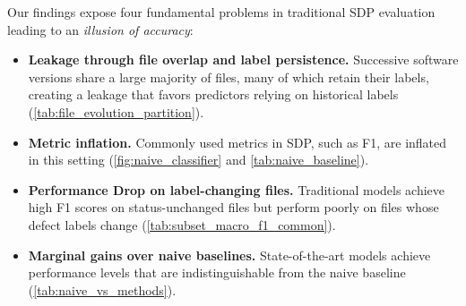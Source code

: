 \documentclass[authoryear,final,5p,times,twocolumn]{elsarticle}
\theoremstyle{plain}
\begin{document}
\begin{table}[!htbp]
\centering
\caption{F1 scores on subsets of common files ($\mathcal{C}$) grouped by file
evolution (\autoref{sec:problem_formulation}): \textit{Same} files have
identical source code, \textit{Unchanged} files have changed source code with
unchanged labels, and \textit{Changed} files have both source-code and label
changes.}
\label{tab:subset_macro_f1_common}
\renewcommand{\arraystretch}{1.2} 
\end{table}

Our findings expose four fundamental problems in traditional SDP evaluation leading to an \emph{illusion of accuracy}:

\begin{itemize}
\item \textbf{Leakage through file overlap and label persistence.} Successive software versions share a large majority of files, many of which retain their labels, creating a leakage that favors predictors relying on historical labels (\autoref{tab:file_evolution_partition}).
\item \textbf{Metric inflation.} Commonly used metrics in SDP, such as F1, are inflated in this setting (\autoref{fig:naive_classifier} and \autoref{tab:naive_baseline}).
\item \textbf{Performance Drop on label-changing files.} Traditional models achieve high F1 scores on status-unchanged files but perform poorly on files whose defect labels change (\autoref{tab:subset_macro_f1_common}).
\item \textbf{Marginal gains over naive baselines.} State-of-the-art models achieve performance levels that are indistinguishable from the naive baseline (\autoref{tab:naive_vs_methods}).
\end{itemize}
\end{document}
